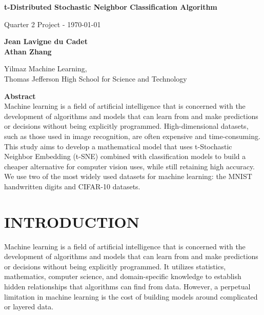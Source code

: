 \documentclass[12pt]{article}
\begin{document}
% 

\begin{titlepage}
\raggedright

\vspace*{2cm}

\Huge 
\textbf{t-Distributed Stochastic Neighbor Classification Algorithm}

\vspace{0.5cm}
\small
Quarter 2 Project - \today

\vspace{1.5cm}
\large
\textbf{Jean Lavigne du Cadet} \\
\textbf{Athan Zhang}

\vspace{1cm}
\small
Yilmaz Machine Learning,\\
Thomas Jefferson High School for Science and Technology

\vfill
\large
\textbf{Abstract} \\
\vspace{0.25cm}
\small
Machine learning is a field of artificial intelligence that is concerned with the development of algorithms and models that can learn from and make predictions or decisions without being explicitly programmed. High-dimensional datasets, such as those used in image recognition, are often expensive and time-consuming. This study aims to develop a mathematical model that uses t-Stochastic Neighbor Embedding (t-SNE) combined with classification models to build a cheaper alternative for computer vision uses, while still retaining high accuracy.  We use two of the most widely used datasets for machine learning: the MNIST handwritten digits and CIFAR-10 datasets.
\vspace*{1cm}


\end{titlepage}

\tableofcontents
\newpage

\section{INTRODUCTION}

Machine learning is a field of artificial intelligence that is concerned with the development of algorithms and models that can learn from and make predictions or decisions without being explicitly programmed. It utilizes statistics, mathematics, computer science, and domain-specific knowledge to establish hidden relationships that algorithms can find from data. However, a perpetual limitation in machine learning is the cost of building models around complicated or layered data. 
\end{document}
